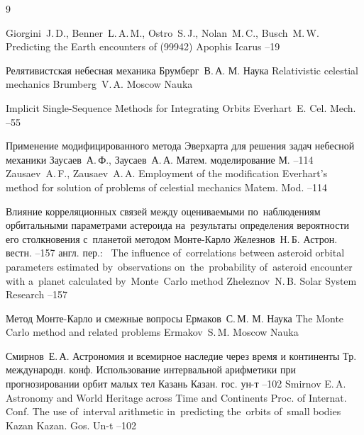 \begin{thebibliography}{9}

\by Giorgini~J.\,D., Benner~L.\,A.\,M., Ostro~S.\,J., Nolan~M.\,C., Busch~M.\,W.
\paper Predicting the Earth encounters of (99942) Apophis
\jour Icarus
--19


\book Релятивистская небесная механика
\by Брумберг~В.\,А.
\publaddr М.
\publ Наука
\misctransl
\book Relativistic celestial mechanics
\by Brumberg~V.\,A.
\publaddr Moscow
\publ Nauka

\paper Implicit Single-Sequence Methods for Integrating Orbits
\by Everhart~E.
\jour Cel. Mech.
--55

\paper Применение модифицированного метода Эверхарта  для решения задач небесной механики
\by Заусаев~А.\,Ф., Заусаев~А.\,А.
\jour Матем. моделирование
\publaddr М.
--114
\misctransl
\by Zausaev~A.\,F., Zausaev~A.\,A.
\paper Employment of the modification Everhart's method for solution of problems of celestial mechanics
\jour Matem. Mod.
--114
		
\paper Влияние корреляционных связей  между оцениваемыми по~наблюдениям орбитальными параметрами астероида на~результаты определения вероятности его столкновения с~планетой методом Монте-Карло
\by Железнов~Н.\,Б.
\jour Астрон. вестн.
--157
\transl англ. пер.:~
\paper The influence of~correlations  between asteroid orbital parameters estimated by~observations on~the~probability of~asteroid encounter with a~planet calculated by~Monte~Carlo method
\by Zheleznov~N.\,B.
\jour Solar System Research
--157


\book Метод Монте-Карло и смежные вопросы
\by Ермаков~С.\,М.
\publaddr М.
\publ Наука
\misctransl
\book The Monte Carlo method and related problems
\by Ermakov~S.\,M.
\publaddr Moscow
\publ Nauka

\by Смирнов~Е.\,А.
\inbook  Астрономия и всемирное наследие через время и континенты
\bookinfo Тр. международн. конф. \nofrills
\paper Использование интервальной арифметики при прогнозировании орбит малых тел
\publaddr Казань
\publ Казан. гос. ун-т
--102
\misctransl
\by Smirnov E.\,A.
\inbook Astronomy and World Heritage across Time and Continents
\bookinfo Proc. of Internat. Conf. \nofrills
\paper The use of~interval arithmetic in~predicting the~orbits of~small bodies
\publaddr Kazan
\publ Kazan. Gos. Un-t
--102


\end{thebibliography}

